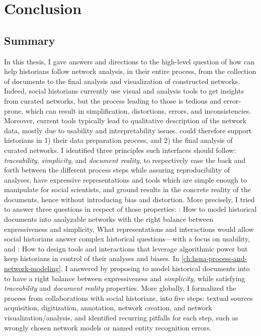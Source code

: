 \chapter{Conclusion}\label{ch:conclusion}
\minitoc

\section{Summary}

In this thesis, I gave answers and directions to the high-level question of how \va can help historians follow network analysis, in their entire process, from the collection of documents to the final analysis and visualization of constructed networks.
Indeed, social historians currently use visual and analysis tools to get insights from curated networks, but the process leading to those is tedious and error-prone, which can result in simplification, distortions, errors, and inconsistencies\cite{alkadi2022, lemercier12FormalNetwork2015}.
Moreover, current tools typically lead to qualitative description of the network data\cite{rollingerProlegomenaProblemsPerspectives2020}, mostly due to usability and interpretability issues.
\va could therefore support historians in 1) their data preparation process, and 2) the final analysis of curated networks.
I identified three principles such \va interfaces should follow: \emph{traceability}, \emph{simplicity}, and \emph{document reality}, to respectively ease the back and forth between the different process steps while assuring reproducibility of analyses, have expressive representations and tools which are simple enough to manipulate for social scientists, and ground results in the concrete reality of the documents, hence without introducing bias and distortion.
More precisely, I tried to answer three questions in respect of those properties: \qone:  How to model historical documents into analyzable networks with the right balance between expressiveness and simplicity, \qtwo What representations and interactions would allow social historians answer complex historical questions---with a focus on usability, and \qthree: How to design \va tools and interactions that leverage algorithmic power but keep historians in control of their analyses and biases.
In \autoref{ch:hsna-process-and-network-modeling}, I answered \qone by proposing to model historical documents into \modelplural to have a right balance between expressiveness and \emph{simplicity}, while satisfying \emph{traceability} and \emph{document reality} properties.
More globally, I formalized the \hsna process from collaborations with social historians, into five steps: textual sources acquisition, digitization, annotation, network creation, and network visualization/analysis, and identified recurring pitfalls for each step, such as wrongly chosen network models or named entity recognition errors.
